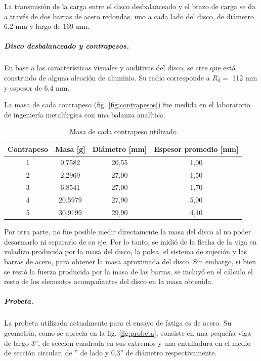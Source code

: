 La transmisión de la carga entre el disco desbalanceado y el brazo de carga se da a través de dos barras de acero redondas, uno a cada lado del disco, de diámetro 6,2 mm y largo de 169 mm.

\subparagraph{Disco desbalanceado y contrapesos.}
En base a las características visuales y auditivas del disco, se cree que está construido de alguna aleación de aluminio. Su radio corresponde a $R_d =$ 112 mm y espesor de 6,4 mm. 

La masa de cada contrapeso (fig. \ref{fig:contrapesos}) fue medida en el laboratorio de ingeniería metalúrgica con una balanza analítica.
\begin{table}[H]
\centering
\begin{tabular}{@{}cccc@{}}
\toprule
Contrapeso & Masa {[}g{]}	& Diámetro {[}mm{]}	&	Espesor promedio {[}mm{]} \\ \midrule
1          & 0,7582			& 20,55				&	1,00	         		  \\
2          & 2,2969       	& 27,00				&	1,50					  \\
3          & 6,8541       	& 27,00				& 	1,70	 		   		  \\
4          & 20,5979      	& 27,90				& 	5,00			 		  \\
5          & 30,9199      	& 29,90				&	4,40			 		  \\ \bottomrule
\end{tabular}
\caption{Masa de cada contrapeso utilizado}
\label{tab:masa_contrapesos}
\end{table}

Por otra parte, no fue posible medir directamente la masa del disco al no poder desarmarlo ni separarlo de su eje. Por lo tanto, se midió de la flecha de la viga en voladizo producida por la masa del disco, la polea, el sistema de sujeción y las barras de acero, para obtener la masa aproximada del disco. Sin embargo, si bien se restó la fuerza producida por la masa de las barras, se incluyó en el cálculo el resto de los elementos acompañantes del disco en la masa obtenida.

\subparagraph{Probeta.} La probeta utilizada actualmente para el ensayo de fatiga es de acero. Su geometría, como se aprecia en la fig. \ref{fig:probeta}, consiste en una pequeña viga de largo 3'', de sección cuadrada en sus extremos y una entalladura en el medio de sección circular, de '' de lado y 0,3'' de diámetro respectivamente.
 
